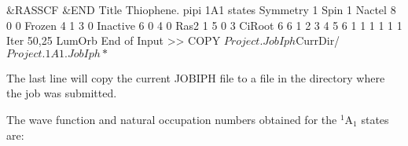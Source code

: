 \begin{inputlisting}
 &RASSCF &END                                                                   
Title                                                                           
 Thiophene. pipi  1A1 states
Symmetry                                                                        
    1                                                                          
Spin                                                                            
    1                                                                           
Nactel                                                                          
    8    0    0                                                                 
Frozen                                                                          
    4    1    3    0                                                            
Inactive                                                                       
    6    0    4    0                                                            
Ras2                                                                            
    1    5    0    3                                                            
CiRoot                                                                        
6 6                                                                           
1 2 3 4 5 6
1 1 1 1 1 1
Iter                                                                            
50,25                                                                           
LumOrb                                                                          
End of Input                                                                    
>> COPY $Project.JobIph $CurrDir/$Project.1A1.JobIph
*$
\end{inputlisting}


The last line will copy the current JOBIPH file to a file in the directory where
the job was submitted.

The wave function and natural occupation numbers obtained for the
$^1$A$_1$ states are:


